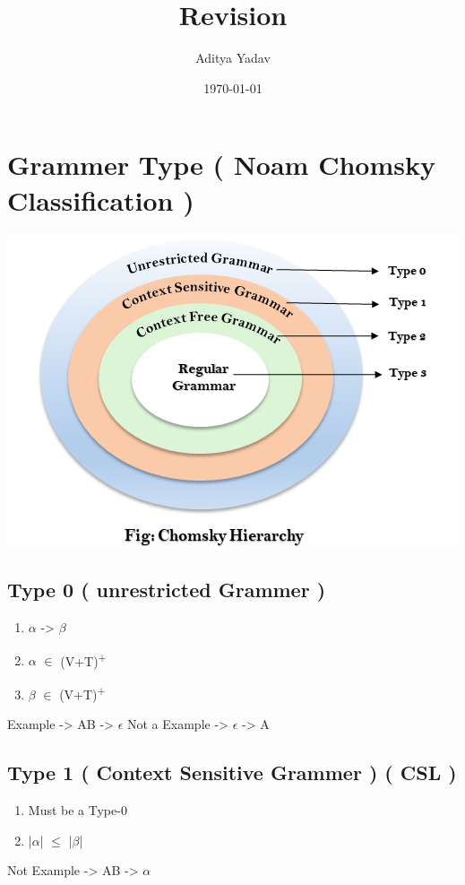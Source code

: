\documentclass[11pt]{article}
\author{Aditya Yadav}
\date{\today}
\title{Revision}
\begin{document}
\maketitle
\tableofcontents


\section{Grammer Type ( Noam Chomsky Classification )}
\label{sec:org13d349d}
\begin{center}
\includegraphics[width=.9\linewidth]{Revision/type_grammer.png}
\end{center}
\subsection{Type 0 ( unrestricted Grammer )}
\label{sec:orgec06a67}
\begin{enumerate}
\item \(\alpha\) -> \(\beta\)
\item \(\alpha\) \(\in\) (V+T)\textsuperscript{+}
\item \(\beta\) \(\in\) (V+T)\textsuperscript{+}
\end{enumerate}
Example -> AB -> \(\epsilon\)
Not a Example -> \(\epsilon\) -> A
\subsection{Type 1 ( Context Sensitive Grammer ) ( CSL )}
\label{sec:orgb3c5111}
\begin{enumerate}
\item Must be a Type-0
\item |\(\alpha\)|  \(\le\) |\(\beta\)|
\end{enumerate}
Not Example -> AB -> \(\alpha\)
\end{document}
